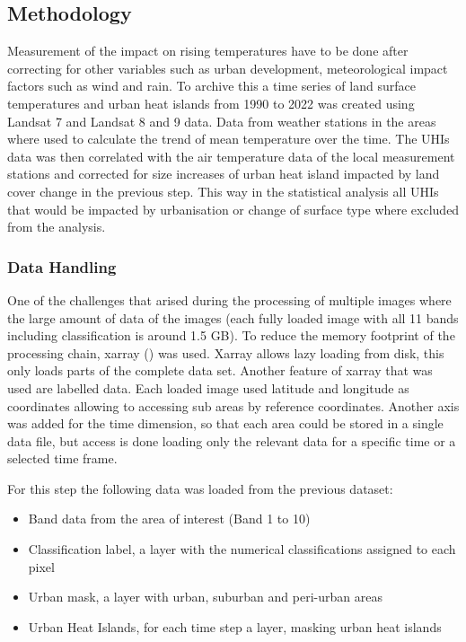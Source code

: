 \documentclass[12pt,a4paper, english,twoside]{article}
\begin{document}
    \subsection{Methodology}
    Measurement of the impact on rising temperatures have to be done after correcting for other variables such as urban development, meteorological impact factors such as wind and rain. 
    To archive this a time series of land surface temperatures and urban heat islands from 1990 to 2022 was created using Landsat 7 and Landsat 8 and 9 data.
    Data from weather stations in the areas where used to calculate the trend of mean temperature over the time. 
    The \glspl{UHI} data was then correlated with the air temperature data of the local measurement stations and corrected for size increases of urban heat island impacted by land cover change in the previous step. 
    This way in the statistical analysis all \glspl{UHI} that would be impacted by urbanisation or change of surface type where excluded from the analysis.
%
    \subsubsection{Data Handling}
    One of the challenges that arised during the processing of multiple images where the large amount of data of the images (each fully loaded image with all 11 bands including classification is around 1.5 GB).
    To reduce the memory footprint of the processing chain, xarray (\cite{hoyer2017xarray}) was used. 
    Xarray allows lazy loading from disk, this only loads parts of the complete data set. 
    Another feature of xarray that was used are labelled data. Each loaded image used latitude and longitude as coordinates allowing to accessing sub areas by reference coordinates. 
    Another axis was added for the time dimension, so that each area could be stored in a single data file, but access is done loading only the relevant data for a specific time or a selected time frame.

    For this step the following data was loaded from the previous dataset: 
    \begin{itemize}
      \item Band data from the area of interest (Band 1 to 10)
      \item Classification label, a layer with the numerical classifications assigned to each pixel 
      \item Urban mask, a layer with urban, suburban and peri-urban areas
      \item Urban Heat Islands, for each time step a layer, masking urban heat islands
    \end{itemize}
    \newpage
\end{document}
